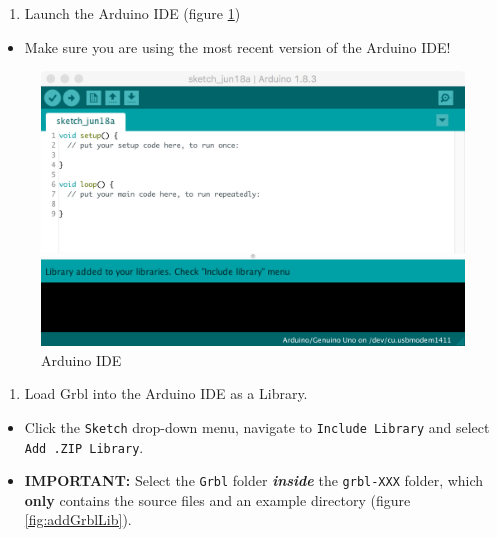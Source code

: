 \documentclass[
]{book}
\providecommand{\tightlist}{%
  \setlength{\itemsep}{0pt}\setlength{\parskip}{0pt}}
\begin{document}
\begin{enumerate}
\def\labelenumi{\arabic{enumi}.}
\setcounter{enumi}{1}
\tightlist
\item
  Launch the Arduino IDE (figure \ref{fig:arduinoIDE})
\end{enumerate}

\begin{itemize}
\tightlist
\item
  Make sure you are using the most recent version of the Arduino IDE!
\end{itemize}

\begin{figure}

{\centering \includegraphics[width=0.75\linewidth]{images/arduino_IDE} 

}

\caption{Arduino IDE}\label{fig:arduinoIDE}
\end{figure}

\begin{enumerate}
\def\labelenumi{\arabic{enumi}.}
\setcounter{enumi}{2}
\tightlist
\item
  Load Grbl into the Arduino IDE as a Library.
\end{enumerate}

\begin{itemize}
\tightlist
\item
  Click the \texttt{Sketch} drop-down menu, navigate to \texttt{Include\ Library} and select \texttt{Add\ .ZIP\ Library}.
\item
  \textbf{IMPORTANT:} Select the \texttt{Grbl} folder \textbf{\emph{inside}} the \texttt{grbl-XXX} folder, which \textbf{only} contains the source files and an example directory (figure \ref{fig:addGrblLib}).
\end{itemize}
\end{document}
